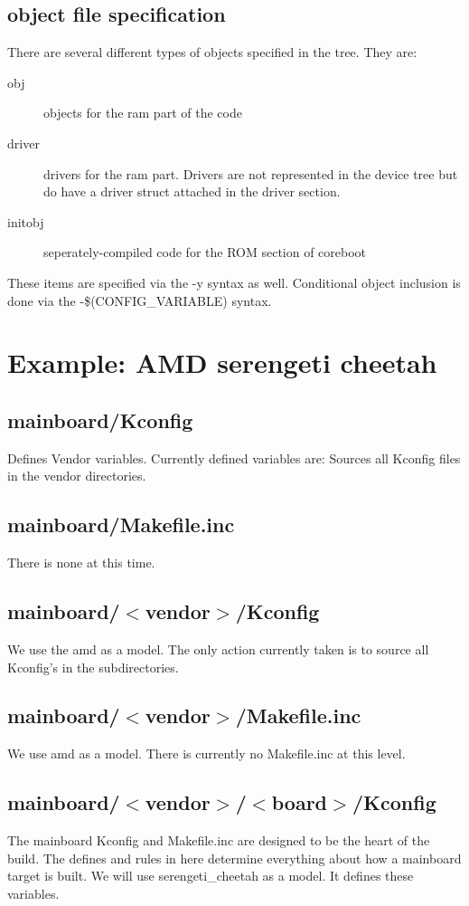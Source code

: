 \documentclass[10pt,letterpaper]{article}
\begin{document}
\subsection{object file specification}
There are several different types of objects specified in the tree. They are:
\begin{description}
\item[obj]objects for the ram part of the code
\item[driver]drivers for the ram part. Drivers are not represented in the device tree but do have a driver struct attached in the driver section.
\item[initobj]seperately-compiled code for the ROM section of coreboot
\end{description}
These items are specified via the -y syntax as well. Conditional object inclusion is done via the -\$(CONFIG\_VARIABLE) syntax.

\section{Example: AMD serengeti cheetah}
\subsection{mainboard/Kconfig}
Defines Vendor variables. Currently defined variables are:
Sources all Kconfig files in the vendor directories.

\subsection{mainboard/Makefile.inc}
There is none at this time.
\subsection{mainboard/$<$vendor$>$/Kconfig}
We use the amd as a model. The only action currently taken is to source all Kconfig's in the
subdirectories.
\subsection{mainboard/$<$vendor$>$/Makefile.inc}
We use amd as a model. There is currently no Makefile.inc at this level.
\subsection{mainboard/$<$vendor$>$/$<$board$>$/Kconfig}
The mainboard Kconfig and Makefile.inc are designed to be the heart of the build. The defines
and rules in here determine everything about how a mainboard target is built.
We will use serengeti\_cheetah as a model. It defines these variables.

\end{document}
